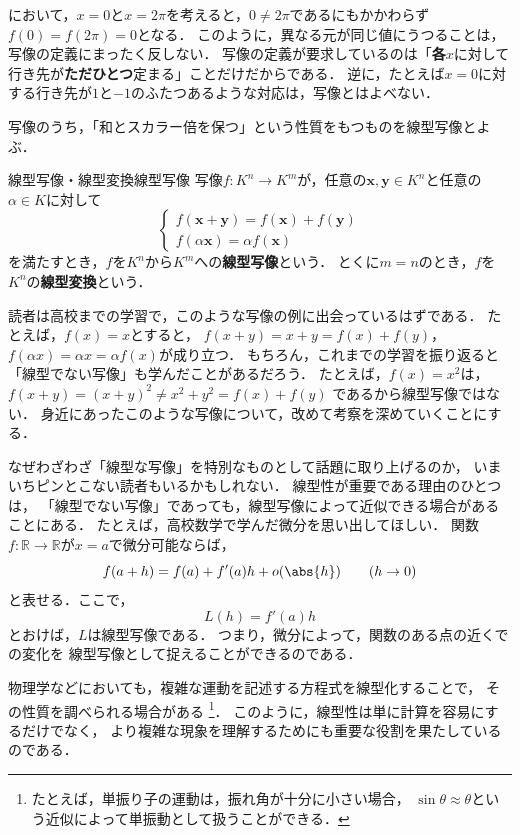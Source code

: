 において，$x = 0$と$x = 2\pi$を考えると，$0 \ne 2\pi$であるにもかかわらず$f(0) = f(2\pi) = 0$となる．
このように，異なる元が同じ値にうつることは，写像の定義にまったく反しない．
写像の定義が要求しているのは「\textbf{各}$x$に対して行き先が\textbf{ただひとつ}定まる」ことだけだからである．
逆に，たとえば$x = 0$に対する行き先が$1$と$-1$のふたつあるような対応は，写像とはよべない．

写像のうち，「和とスカラー倍を保つ」という性質をもつものを線型写像とよぶ．

\begin{definition}{線型写像・線型変換}{線型写像}
  写像$f \colon K^n \to K^m$が，任意の$\bm{x}, \bm{y} \in K^n$と任意の$\alpha \in K$に対して
  \[
    \begin{cases}
      f(\bm{x} + \bm{y}) = f(\bm{x}) + f(\bm{y}) \\
      f(\alpha\bm{x}) = \alpha f(\bm{x})
    \end{cases}
  \]
  を満たすとき，$f$を$K^n$から$K^m$への\textbf{線型写像}という．
  とくに$m = n$のとき，$f$を$K^n$の\textbf{線型変換}という．
\end{definition}

読者は高校までの学習で，このような写像の例に出会っているはずである．
たとえば，$f(x) = x$とすると，
$f(x + y) = x + y = f(x) + f(y)$，
$f(\alpha x) = \alpha x = \alpha f(x)$が成り立つ．
もちろん，これまでの学習を振り返ると「線型でない写像」も学んだことがあるだろう．
たとえば，$f(x) = x^2$は，
$f(x + y) = (x + y)^2 \ne x^2 + y^2 = f(x) + f(y)$
であるから線型写像ではない．
身近にあったこのような写像について，改めて考察を深めていくことにする．

\begin{mycolumn}
なぜわざわざ「線型な写像」を特別なものとして話題に取り上げるのか，
いまいちピンとこない読者もいるかもしれない．
線型性が重要である理由のひとつは，
「線型でない写像」であっても，線型写像によって近似できる場合があることにある．
たとえば，高校数学で学んだ微分を思い出してほしい．
関数$f \colon \mathbb{R} \to \mathbb{R}$が$x=a$で微分可能ならば，
\[
  f(a+h)=f(a)+f'(a)h+o(\abs{h})
  \qquad(h\to0)
\]
と表せる．ここで，
\[
  L(h)=f'(a)h
\]
とおけば，$L$は線型写像である．
つまり，微分によって，関数のある点の近くでの変化を
線型写像として捉えることができるのである．

物理学などにおいても，複雑な運動を記述する方程式を線型化することで，
その性質を調べられる場合がある%
\footnote{たとえば，単振り子の運動は，振れ角が十分に小さい場合，
$\sin\theta \approx \theta$という近似によって単振動として扱うことができる．}．
このように，線型性は単に計算を容易にするだけでなく，
より複雑な現象を理解するためにも重要な役割を果たしているのである．
\end{mycolumn}

